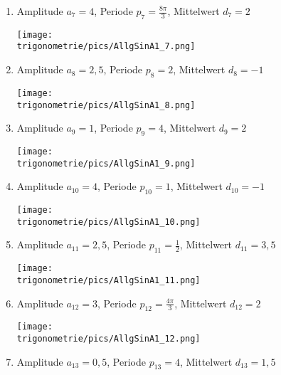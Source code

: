 \begin{Answer}[ref=allgSinCosA1]
\begin{enumerate}[label=\alph*)]
		\item Amplitude \(a_{7}=4\), Periode \(p_{7}=\frac{8\pi}{3}\), Mittelwert \(d_{7}=2\)\\
		\begin{minipage}{\textwidth}
			\texttt{[image: \\trigonometrie/pics/AllgSinA1\_7.png]}\\
		\end{minipage}	 
		\item Amplitude \(a_{8}=2,5\), Periode \(p_{8}=2\), Mittelwert \(d_{8}=-1\)\\
		\begin{minipage}{\textwidth}
			\texttt{[image: \\trigonometrie/pics/AllgSinA1\_8.png]}\\
		\end{minipage}	\newpage
		\item Amplitude \(a_{9}=1\), Periode \(p_{9}=4\), Mittelwert \(d_{9}=2\)\\
		\begin{minipage}{\textwidth}
			\texttt{[image: \\trigonometrie/pics/AllgSinA1\_9.png]}\\
		\end{minipage}	 
		\item Amplitude \(a_{10}=4\), Periode \(p_{10}=1\), Mittelwert \(d_{10}=-1\)\\
		\begin{minipage}{\textwidth}
			\texttt{[image: \\trigonometrie/pics/AllgSinA1\_10.png]}\\
		\end{minipage}	 
		\item Amplitude \(a_{11}=2,5\), Periode \(p_{11}=\frac{1}{2}\), Mittelwert \(d_{11}=3,5\)\\
		\begin{minipage}{\textwidth}
			\texttt{[image: \\trigonometrie/pics/AllgSinA1\_11.png]}\\
		\end{minipage}	 
		\item Amplitude \(a_{12}=3\), Periode \(p_{12}=\frac{4\pi}{3}\), Mittelwert \(d_{12}=2\)\\
		\begin{minipage}{\textwidth}
			\texttt{[image: \\trigonometrie/pics/AllgSinA1\_12.png]}\\
		\end{minipage}	 \newpage
		\item Amplitude \(a_{13}=0,5\), Periode \(p_{13}=4\), Mittelwert \(d_{13}=1,5\)\\

\end{enumerate}
\end{Answer}
